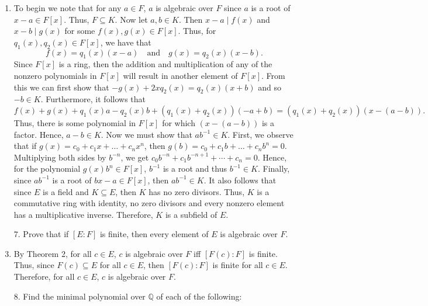 \documentclass[12pt]{article}
\makeatletter
\theoremstyle{definition}
\theoremstyle{remark}
\renewenvironment{proof}[1][\proofname]{\par
  \pushQED{\qed}%
  \normalfont \topsep6\p@\@plus6\p@\relax
  \list{}{\leftmargin=0mm
          \rightmargin=4mm
          \settowidth{\itemindent}{\itshape#1}%
          \labelwidth=\itemindent
          \parsep=0pt \listparindent=\parindent 
  }
  \item[\hskip\labelsep
        \itshape
    #1\@addpunct{.}]\ignorespaces
}{%
  \popQED\endlist\@endpefalse
}
\let\oldproofname=\proofname
\renewcommand{\proofname}{\bf{\textit{\oldproofname}}}
\makeatother
\begin{document}
\begin{enumerate}[leftmargin=*]
            \begin{proof}
                To begin we note that for any $a\in F$, $a$ is algebraic over $F$ since $a$ is a root of $x-a\in F[x]$. Thus, $F\subseteq K$. Now let $a,b\in K$. Then $x-a\mid f(x)$ and $x-b\mid g(x)$ for some $f(x),g(x)\in F[x]$. Thus, for $q_1(x),q_2(x)\in F[x]$, we have that 
                    \begin{equation*}
                        f(x)=q_1(x)(x-a)\quad\text{and}\quad g(x)=q_2(x)(x-b).
                    \end{equation*}
                Since $F[x]$ is a ring, then the addition and multiplication of any of the nonzero polynomials in $F[x]$ will result in another element of $F[x]$. From this we can first show that $-g(x)+2xq_2(x)=q_2(x)(x+b)$ and so $-b\in K$. Furthermore, it follows that 
                    \begin{equation*}
                        f(x)+g(x)+q_1(x)a-q_2(x)b+(q_1(x)+q_2(x))(-a+b)=(q_1(x)+q_2(x))(x-(a-b)).
                    \end{equation*}
                Thus, there is some polynomial in $F[x]$ for which $(x-(a-b))$ is a factor. Hence, $a-b\in K$. Now we must show that $ab^{-1}\in K$. First, we observe that if $g(x)=c_0+c_1x+\dots+c_nx^n$, then $g(b)=c_0+c_1b+\dots+c_nb^n=0$. Multiplying both sides by $b^{-n}$, we get $c_0b^{-n}+c_1b^{-n+1}+\cdots+c_n=0$. Hence, for the polynomial $g(x)b^n\in F[x]$, $b^{-1}$ is a root and thus $b^{-1}\in K$. Finally, since $ab^{-1}$ is a root of $bx-a\in F[x]$, then $ab^{-1}\in K$. It also follows that since $E$ is a field and $K\subseteq E$, then $K$ has no zero divisors. Thus, $K$ is a commutative ring with identity, no zero divisors and every nonzero element has a multiplicative inverse. Therefore, $K$ is a subfield of $E$.
            \end{proof}
        \item [7.] Prove that if $[E\colon F]$ is finite, then every element of $E$ is algebraic over $F$.
            \begin{proof}
                By Theorem 2, for all $c\in E$, $c$ is algebraic over $F$ iff $[F(c)\colon F]$ is finite. Thus, since $F(c)\subseteq E$ for all $c\in E$, then $[F(c)\colon F]$ is finite for all $c\in E$. Therefore, for all $c\in E$, $c$ is algebraic over $F$.  
            \end{proof}
        \item[8.] Find the minimal polynomial over $\mathbb{Q}$ of each of the following:
            \begin{enumerate}

\end{enumerate}
\end{enumerate}
\end{document}

